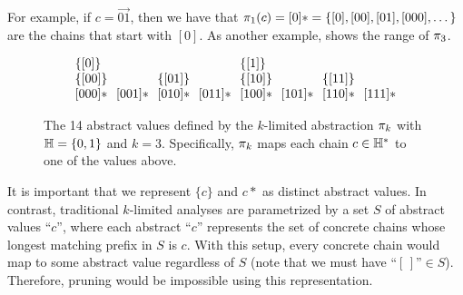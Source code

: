 For example, if $c = \vec{01}$,
then we have that $\pi_1(c) = [0]* = \{ [0], [00], [01], [000], \dots \}$
are the chains that start with $[0]$.
As another example,  shows the range of $\pi_3$.

\begin{figure}
\[
\arraycolsep=3.5pt
\begin{array}{llllllll}
\{\vec{0}\}    &            &              &            & \{\vec{1}\} \\
\{\vec{00}\}   &            & \{\vec{01}\} &            & \{\vec{10}\} &            & \{\vec{11}\} \\
\vec{000}*     & \vec{001}* & \vec{010}*   & \vec{011}* & \vec{100}*   & \vec{101}* & \vec{110}* & \vec{111}*
\end{array}
\]
\caption{\label{fig:repeatingExample}
The 14 abstract values defined by the $k$-limited abstraction $\pi_k$
with ${\mathbb H} = \{ 0, 1 \}$ and $k = 3$.
Specifically, $\pi_k$ maps each chain $c \in {\mathbb H}^*$ to one of the values above.
}
\end{figure}

It is important that we represent $\{c\}$ and $c*$ as distinct abstract values.
In contrast, traditional $k$-limited analyses are parametrized by a set $S$ of abstract values ``$c$'',
where each abstract ``$c$'' represents the set of concrete chains whose longest
matching prefix in $S$ is $c$.
With this setup,
every concrete chain would map to some abstract value regardless of $S$
(note that we must have $\text{``$[\,]$''} \in S$).
Therefore, pruning would be impossible using this representation.



